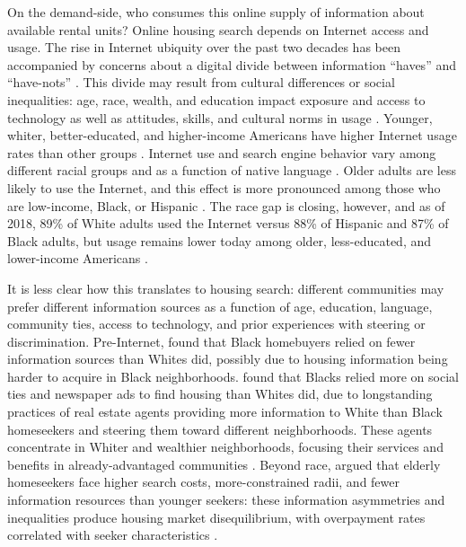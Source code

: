 \documentclass[11pt,letterpaper]{article}
\begin{document}
On the demand-side, who consumes this online supply of information about available rental units? Online housing search depends on Internet access and usage. The rise in Internet ubiquity over the past two decades has been accompanied by concerns about a digital divide between information \enquote{haves} and \enquote{have-nots} \citep{hersberger_are_2003,riddlesden_broadband_2014}. This divide may result from cultural differences or social inequalities: age, race, wealth, and education impact exposure and access to technology as well as attitudes, skills, and cultural norms in usage \citep{jones_u.s._2009,robinson_digital_2015}. Younger, whiter, better-educated, and higher-income Americans have higher Internet usage rates than other groups \citep{porter_using_2006}. Internet use and search engine behavior vary among different racial groups and as a function of native language \citep{slate_digital_2002,weber_who_2011}. Older adults are less likely to use the Internet, and this effect is more pronounced among those who are low-income, Black, or Hispanic \citep{choi_digital_2013}. The race gap is closing, however, and as of 2018, 89\% of White adults used the Internet versus 88\% of Hispanic and 87\% of Black adults, but usage remains lower today among older, less-educated, and lower-income Americans \citep{pew_research_center_internet_2018,pew_research_center_10_2019}.

It is less clear how this translates to housing search: different communities may prefer different information sources as a function of age, education, language, community ties, access to technology, and prior experiences with steering or discrimination. Pre-Internet, \citet{newburger_sources_1995} found that Black homebuyers relied on fewer information sources than Whites did, possibly due to housing information being harder to acquire in Black neighborhoods. \citet{farley_racial_1996} found that Blacks relied more on social ties and newspaper ads to find housing than Whites did, due to longstanding practices of real estate agents providing more information to White than Black homeseekers and steering them toward different neighborhoods. These agents concentrate in Whiter and wealthier neighborhoods, focusing their services and benefits in already-advantaged communities \citep{besbris_investigating_2017}. Beyond race, \citet{deboer_resident_1985} argued that elderly homeseekers face higher search costs, more-constrained radii, and fewer information resources than younger seekers: these information asymmetries and inequalities produce housing market disequilibrium, with overpayment rates correlated with seeker characteristics \cite[cf.][]{desmond_are_2016,desmond_poor_2019}.
\end{document}
